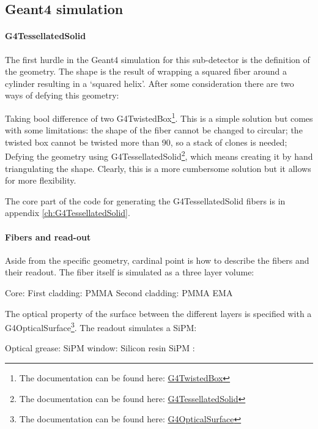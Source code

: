\begin{refsection}
\subsection{Geant4 simulation}
\paragraph{G4TessellatedSolid} The first hurdle in the Geant4 simulation for this sub-detector is the definition of the geometry. 
The shape is the result of wrapping a squared fiber around a cylinder resulting in a `squared helix'.
After some consideration there are two ways of defying this geometry:
\begin{outline}
    \1 Taking bool difference of two G4TwistedBox\footnote{The documentation can be found here: \href{https://apc.u-paris.fr/~franco/g4doxy/html/classG4TwistedBox.html}{G4TwistedBox}}. 
    This is a simple solution but comes with some limitations: the shape of the fiber cannot be changed to circular; the twisted box cannot be twisted more than \SI{90}{\deg}, so a stack of clones is needed; 
    \1 Defying the geometry using G4TessellatedSolid\footnote{The documentation can be found here: \href{https://apc.u-paris.fr/~franco/g4doxy/html/classG4TessellatedSolid.html}{G4TessellatedSolid}}, which means creating it by hand triangulating the shape. Clearly, this is a more cumbersome solution but it allows for more flexibility.
\end{outline}
The core part of the code for generating the G4TessellatedSolid fibers is in appendix \ref{ch:G4TessellatedSolid}.

\paragraph{Fibers and read-out} Aside from the specific geometry, cardinal point is how to describe the fibers and their readout. 
The fiber itself is simulated as a three layer volume:
\begin{outline}
    \1 Core: 
    \1 First cladding: PMMA
    \1 Second cladding: PMMA EMA
\end{outline}
The optical property of the surface between the different layers is specified with a G4OpticalSurface\footnote{The documentation can be found here: \href{https://apc.u-paris.fr/~franco/g4doxy/html/classG4OpticalSurface.html}{G4OpticalSurface}}.
The readout simulates a SiPM:
\begin{outline}
    \1 Optical grease: 
    \1 SiPM window: Silicon resin
    \1 SiPM :
\end{outline}


\end{refsection}
